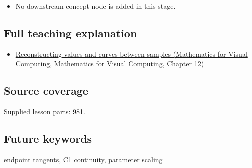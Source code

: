 \begin{itemize}
\tightlist
\item
  No downstream concept node is added in this stage.
\end{itemize}

\subsection{Full teaching explanation}\label{appendix-db3aef8f2fd6-full-teaching-explanation}

\begin{itemize}
\tightlist
\item
  \href{../02-Mathematics-for-Visual-Computing/main.pdf\#nameddest=02-foundations-ii-ch028-reconstructing-values-and-curves-between-samples}{Reconstructing values and curves between samples (Mathematics for Visual Computing, Mathematics for Visual Computing, Chapter 12)}
\end{itemize}

\subsection{Source coverage}\label{appendix-db3aef8f2fd6-source-coverage}

Supplied lesson parts: 981.

\subsection{Future keywords}\label{appendix-db3aef8f2fd6-future-keywords}

endpoint tangents, C1 continuity, parameter scaling
